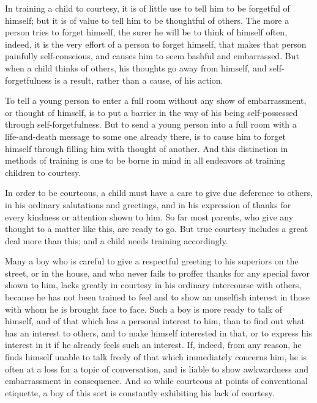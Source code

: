 \documentclass[
]{book}
\begin{document}
In training a child to courtesy, it is of little use to tell him to be forgetful of himself; but it is of value to tell him to be thoughtful of others. The more a person tries to forget himself, the surer he will be to think of himself often, indeed, it is the very effort of a person to forget himself, that makes that person painfully self-conscious, and causes him to seem bashful and embarrassed. But when a child thinks of others, his thoughts go away from himself, and self-forgetfulness is a result, rather than a cause, of his action.

To tell a young person to enter a full room without any show of embarrassment, or thought of himself, is to put a barrier in the way of his being self-possessed through self-forgetfulness. But to send a young person into a full room with a life-and-death message to some one already there, is to cause him to forget himself through filling him with thought of another. And this distinction in methods of training is one to be borne in mind in all endeavors at training children to courtesy.

In order to be courteous, a child must have a care to give due deference to others, in his ordinary salutations and greetings, and in his expression of thanks for every kindness or attention shown to him. So far most parents, who give any thought to a matter like this, are ready to go. But true courtesy includes a great deal more than this; and a child needs training accordingly.

Many a boy who is careful to give a respectful greeting to his superiors on the street, or in the house, and who never fails to proffer thanks for any special favor shown to him, lacks greatly in courtesy in his ordinary intercourse with others, because he has not been trained to feel and to show an unselfish interest in those with whom he is brought face to face. Such a boy is more ready to talk of himself, and of that which has a personal interest to him, than to find out what has an interest to others, and to make himself interested in that, or to express his interest in it if he already feels such an interest. If, indeed, from any reason, he finds himself unable to talk freely of that which immediately concerns him, he is often at a loss for a topic of conversation, and is liable to show awkwardness and embarrassment in consequence. And so while courteous at points of conventional etiquette, a boy of this sort is constantly exhibiting his lack of courtesy.
\end{document}
